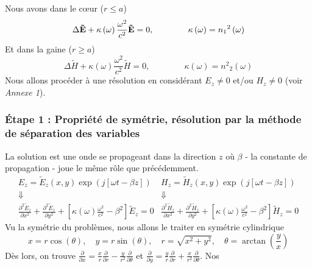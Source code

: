 Nous avons dans le cœur ($r\leq a$)
\begin{equation}
\Delta {\bf{\tilde E}} + \kappa \left( \omega  \right)\frac{{{\omega ^2}}}{{{c^2}}}{\bf{\tilde E}} = 0,\qquad\qquad
\kappa \left( \omega  \right) = {n_1}^2\left( \omega  \right)
\end{equation}
Et dans la gaine ($r\geq a$)
\begin{equation}
\Delta \tilde H + \kappa \left( \omega  \right)\frac{{{\omega ^2}}}{{{c^2}}}\tilde H = 0,\qquad\qquad
\kappa \left( \omega  \right) = {n^2}_2\left( \omega  \right)
\end{equation}
Nous allons procéder à une résolution en considérant $E_z\neq 0$ et/ou $H_z\neq 0$ (voir 
\textit{Annexe 1}).

\subsubsection{Étape 1 : Propriété de symétrie, résolution par la méthode de séparation des variables}
La solution est une onde se propageant dans la direction $z$ où $\beta$ - la constante de 
propagation - joue le même rôle que précédemment.
\begin{equation}
\begin{array}{cc}
{E_z} = {\tilde E_z}(x,y)\exp (j[\omega t - \beta z]) & {H_z} = {\tilde H_z}(x,y)\exp (j[\omega t - \beta z])\\
\Downarrow & \Downarrow\\
\frac{{{\partial ^2}{{\tilde E}_z}}}{{\partial {x^2}}} + \frac{{{\partial ^2}{{\tilde E}_z}}}{{\partial {y^2}}} + [\kappa (\omega )\frac{{{\omega ^2}}}{{{c^2}}} - {\beta ^2}]{\tilde E_z} = 0
 & \frac{{{\partial ^2}{{\tilde H}_z}}}{{\partial {x^2}}} + \frac{{{\partial ^2}{{\tilde H}_z}}}{{\partial {y^2}}} + [\kappa (\omega )\frac{{{\omega ^2}}}{{{c^2}}} - {\beta ^2}]{\tilde H_z} = 0
\end{array}
\end{equation}
Vu la symétrie du problèmes, nous allons le traiter en symétrie cylindrique
\begin{equation}
x = r\cos (\theta ),\quad
y = r\sin (\theta ),\quad
r = \sqrt {{x^2} + {y^2}},\quad
\theta  = \arctan (\frac{y}{x})
\end{equation}
Dès lors, on trouve  $\frac{\partial }{{\partial x}} = \frac{x}{r}\frac{\partial }{{\partial r}} - \frac{y}{{{r^2}}}\frac{\partial }{{\partial \theta }}$ et $\frac{\partial }{{\partial y}} = \frac{y}{r}\frac{\partial }{{\partial r}} + \frac{x}{{{r^2}}}\frac{\partial }{{\partial \theta }}$. Nos 
